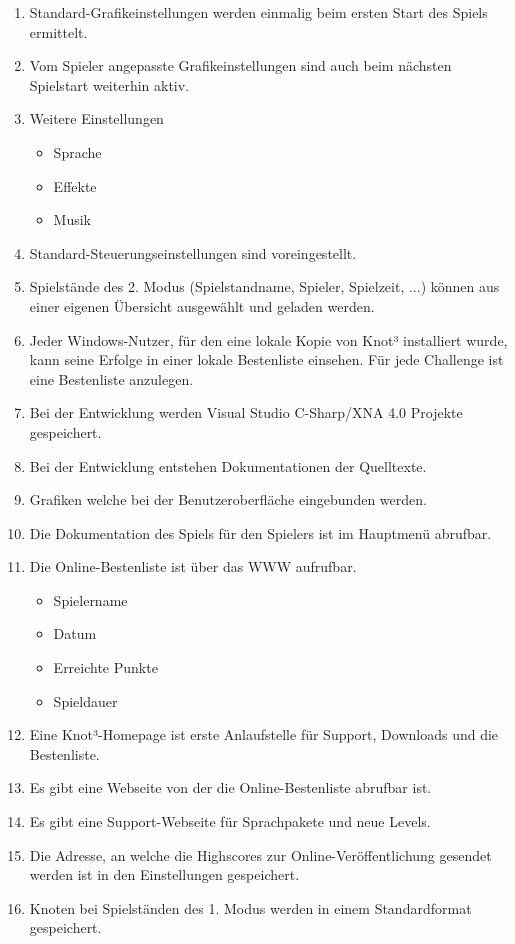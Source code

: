 \begin{enumerate}
\item Standard-Grafikeinstellungen werden einmalig beim ersten Start des Spiels ermittelt.
\item Vom Spieler angepasste Grafikeinstellungen sind auch beim nächsten Spielstart weiterhin aktiv.
\item Weitere Einstellungen

  \begin{itemize}
     \item Sprache
     \item Effekte
     \item Musik
  \end{itemize}

\item Standard-Steuerungseinstellungen sind voreingestellt.
\item Spielstände des 2. Modus (Spielstandname, Spieler, Spielzeit, ...) können aus einer eigenen Übersicht ausgewählt und geladen werden.
\item Jeder Windows-Nutzer, für den eine lokale Kopie von Knot³ installiert wurde, kann seine Erfolge in einer lokale Bestenliste einsehen. Für jede Challenge ist eine Bestenliste anzulegen.
\item Bei der Entwicklung werden Visual Studio C-Sharp/XNA 4.0 Projekte gespeichert.
\item Bei der Entwicklung entstehen Dokumentationen der Quelltexte.
\item Grafiken welche bei der Benutzeroberfläche eingebunden werden.
\item Die Dokumentation des Spiels für den Spielers ist im Hauptmenü abrufbar.
\item Die Online-Bestenliste ist über das WWW aufrufbar.

  \begin{itemize}
     \item Spielername
     \item Datum
     \item Erreichte Punkte
     \item Spieldauer
  \end{itemize}
  
\item Eine Knot³-Homepage ist erste Anlaufstelle für Support, Downloads und die Bestenliste.
\item Es gibt eine Webseite von der die Online-Bestenliste abrufbar ist.
\item Es gibt eine Support-Webseite für Sprachpakete und neue Levels.
\item Die Adresse, an welche die Highscores zur Online-Veröffentlichung gesendet werden ist in den Einstellungen gespeichert.
\item Knoten bei Spielständen des 1. Modus werden in einem Standardformat gespeichert.


\end{enumerate}
